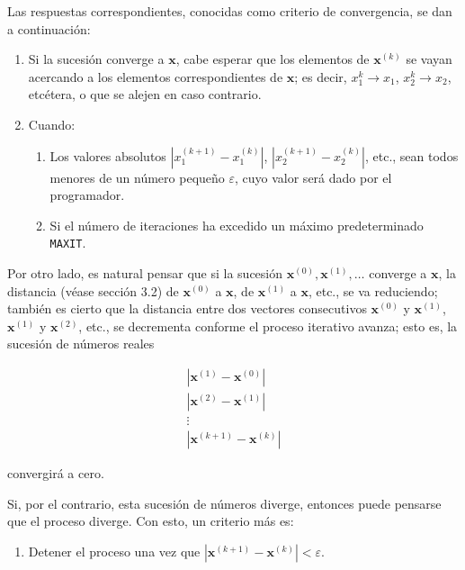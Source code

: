 \documentclass[12pt,letterpaper]{article}
\theoremstyle{definition}
\theoremstyle{plain}
\theoremstyle{remark}
\begin{document}
Las respuestas correspondientes, conocidas como criterio de convergencia, se dan a continuación:

\begin{enumerate}
    \item Si la sucesión converge a $\mathbf{x}$, cabe esperar que los elementos de $\mathbf{x}^{(k)}$ se vayan acercando a los elementos correspondientes de $\mathbf{x}$; es decir, $x_1^{k} \to x_1$, $x_2^{k} \to x_2$, etcétera, o que se alejen en caso contrario.
    \item Cuando:
    \begin{enumerate}
        \item[a)] Los valores absolutos $|x_1^{(k+1)} - x_1^{(k)}|$, $|x_2^{(k+1)} - x_2^{(k)}|$, etc., sean todos menores de un número pequeño $\varepsilon$, cuyo valor será dado por el programador.
        \item[b)] Si el número de iteraciones ha excedido un máximo predeterminado \texttt{MAXIT}.
    \end{enumerate}
\end{enumerate}

Por otro lado, es natural pensar que si la sucesión $\mathbf{x}^{(0)}, \mathbf{x}^{(1)}, \ldots$ converge a $\mathbf{x}$, la distancia (véase sección 3.2) de $\mathbf{x}^{(0)}$ a $\mathbf{x}$, de $\mathbf{x}^{(1)}$ a $\mathbf{x}$, etc., se va reduciendo; también es cierto que la distancia entre dos vectores consecutivos $\mathbf{x}^{(0)}$ y $\mathbf{x}^{(1)}$, $\mathbf{x}^{(1)}$ y $\mathbf{x}^{(2)}$, etc., se decrementa conforme el proceso iterativo avanza; esto es, la sucesión de números reales

\begin{equation}
\begin{aligned}
|\mathbf{x}^{(1)} - \mathbf{x}^{(0)}| \\
|\mathbf{x}^{(2)} - \mathbf{x}^{(1)}| \\
\vdots \\
|\mathbf{x}^{(k+1)} - \mathbf{x}^{(k)}|
\end{aligned}
\label{eq:3.95}
\tag{15}
\end{equation}

\noindent
convergirá a cero.

Si, por el contrario, esta sucesión de números diverge, entonces puede pensarse que el proceso diverge. Con esto, un criterio más es:

\begin{enumerate}
    \item[c)] Detener el proceso una vez que $|\mathbf{x}^{(k+1)} - \mathbf{x}^{(k)}| < \varepsilon$.
\end{enumerate}
\end{document}
